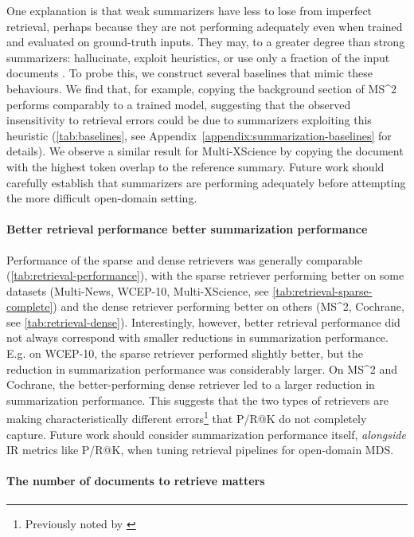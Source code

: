 \documentclass[11pt]{article}
\newcommand\mstoo{{MS\^{}2}\xspace}
\begin{document}
One explanation is that weak summarizers have less to lose from imperfect retrieval, perhaps because they are not performing adequately even when trained and evaluated on ground-truth inputs. They may, to a greater degree than strong summarizers: hallucinate, exploit heuristics, or use only a fraction of the input documents \citep{kryscinski-etal-2019-neural, https://doi.org/10.48550/arxiv.2210.12688}. To probe this, we construct several baselines that mimic these behaviours. We find that, for example, copying the background section of \mstoo performs comparably to a trained model, suggesting that the observed insensitivity to retrieval errors could be due to summarizers exploiting this heuristic (\autoref{tab:baselines}, see Appendix~\ref{appendix:summarization-baselines} for details). We observe a similar result for Multi-XScience by copying the document with the highest token overlap to the reference summary. Future work should carefully establish that summarizers are performing adequately before attempting the more difficult open-domain setting.

\paragraph{Better retrieval performance  better summarization performance}

Performance of the sparse and dense retrievers was generally comparable (\autoref{tab:retrieval-performance}), with the sparse retriever performing better on some datasets (Multi-News, WCEP-10, Multi-XScience, see \autoref{tab:retrieval-sparse-complete}) and the dense retriever performing better on others (\mstoo, Cochrane, see \autoref{tab:retrieval-dense}). Interestingly, however, better retrieval performance did not always correspond with smaller reductions in summarization performance. E.g. on WCEP-10, the sparse retriever performed slightly better, but the reduction in summarization performance was considerably larger. On \mstoo and Cochrane, the better-performing dense retriever led to a larger reduction in summarization performance. This suggests that the two types of retrievers are making characteristically different errors\footnote{Previously noted by \citet{macavaney-etal-2022-abnirml}} that P/R@K do not completely capture. Future work should consider summarization performance itself, \textit{alongside} IR metrics like P/R@K, when tuning retrieval pipelines for open-domain MDS.

\paragraph{The number of documents to retrieve matters} \label{choosing-k}
\end{document}
